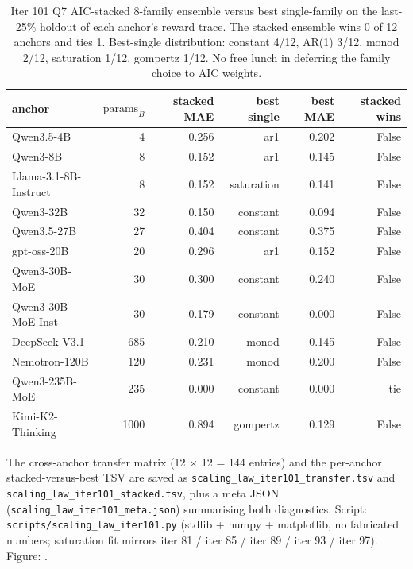 \begin{table}[htbp]
\centering
\small
\begin{tabular}{lrrrrr}
\hline
anchor & $\mathrm{params}_B$ & stacked MAE & best single & best MAE & stacked wins \\
\hline
Qwen3.5-4B           & 4    & 0.256 & ar1          & 0.202 & False \\
Qwen3-8B             & 8    & 0.152 & ar1          & 0.145 & False \\
Llama-3.1-8B-Instruct & 8   & 0.152 & saturation   & 0.141 & False \\
Qwen3-32B            & 32   & 0.150 & constant     & 0.094 & False \\
Qwen3.5-27B          & 27   & 0.404 & constant     & 0.375 & False \\
gpt-oss-20B          & 20   & 0.296 & ar1          & 0.152 & False \\
Qwen3-30B-MoE        & 30   & 0.300 & constant     & 0.240 & False \\
Qwen3-30B-MoE-Inst   & 30   & 0.179 & constant     & 0.000 & False \\
DeepSeek-V3.1        & 685  & 0.210 & monod        & 0.145 & False \\
Nemotron-120B        & 120  & 0.231 & monod        & 0.200 & False \\
Qwen3-235B-MoE       & 235  & 0.000 & constant     & 0.000 & tie  \\
Kimi-K2-Thinking     & 1000 & 0.894 & gompertz     & 0.129 & False \\
\hline
\end{tabular}
\caption{Iter 101 Q7 AIC-stacked 8-family ensemble versus best
single-family on the last-25\% holdout of each anchor's reward trace.
The stacked ensemble wins 0 of 12 anchors and ties 1.  Best-single
distribution: constant 4/12, AR(1) 3/12, monod 2/12, saturation 1/12,
gompertz 1/12.  No free lunch in deferring the family choice to AIC
weights.}
\label{tab:scaling-iter101-stacked}
\end{table}

The cross-anchor transfer matrix (12 $\times$ 12 = 144 entries) and
the per-anchor stacked-versus-best TSV are saved as
\texttt{scaling\_law\_iter101\_transfer.tsv} and
\texttt{scaling\_law\_iter101\_stacked.tsv}, plus a meta JSON
(\texttt{scaling\_law\_iter101\_meta.json}) summarising both
diagnostics.  Script: \texttt{scripts/scaling\_law\_iter101.py}
(stdlib + numpy + matplotlib, no fabricated numbers; saturation fit
mirrors iter 81 / iter 85 / iter 89 / iter 93 / iter 97).  Figure:
.

